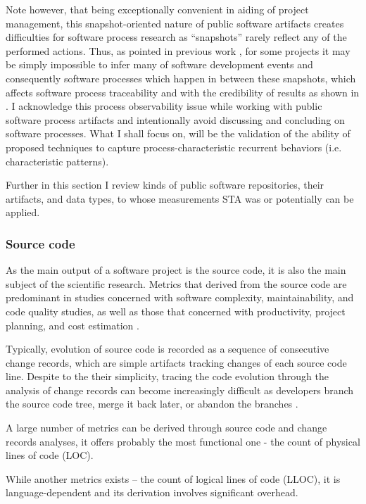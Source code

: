 Note however, that being exceptionally convenient in aiding of project management, this snapshot-oriented nature of 
public software artifacts creates difficulties for software process research as ``snapshots'' rarely reflect any of the 
performed actions. 
Thus, as pointed in previous work \cite{citeulike:1296888}, for some projects it may be simply impossible to infer 
many of software development events and consequently software processes which happen in between these snapshots,
which affects software process traceability and with the credibility of results as shown 
in \cite{citeulike:2280690} \cite{citeulike:9037939}. I acknowledge this process observability issue while working with 
public software process artifacts and intentionally avoid discussing and concluding on software processes. 
What I shall focus on, will be the validation of the ability of proposed techniques to capture process-characteristic 
recurrent behaviors (i.e. characteristic patterns).

Further in this section I review kinds of public software repositories, their artifacts, and data types, to whose 
measurements STA was or potentially can be applied. 

\subsubsection{Source code}
As the main output of a software project is the source code, it is also the main subject of the scientific research. 
Metrics that derived from the source code are predominant in studies concerned with software complexity, maintainability,
and code quality studies, as well as those that concerned with productivity, project planning, 
and cost estimation \cite{citeulike:4534888}. 

Typically, evolution of source code is recorded as a sequence of consecutive change records, which are simple artifacts 
tracking changes of each source code line. Despite to the their simplicity, tracing the code evolution through the analysis 
of change records can become increasingly difficult as developers branch the source code tree, merge it back later, 
or abandon the branches \cite{citeulike:13156191}.

A large number of metrics can be derived through source code and change records analyses, it offers probably the most functional one - the count of physical 
lines of code (LOC). 

While another metrics exists -- the count of logical lines of code (LLOC), it is language-dependent and its derivation involves 
significant overhead.


